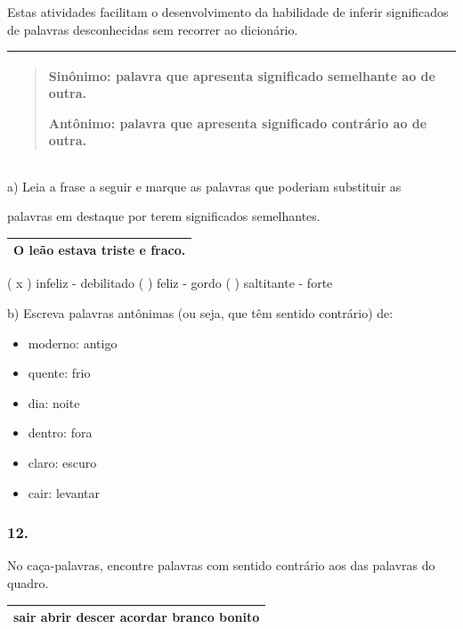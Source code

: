 Estas atividades facilitam o desenvolvimento da habilidade de inferir
significados de palavras desconhecidas sem recorrer ao dicionário.

\begin{longtable}[]{@{}l@{}}
\toprule
\begin{minipage}[t]{0.97\columnwidth}\raggedright\strut
\begin{quote}
\textbf{Sinônimo:} palavra que apresenta significado semelhante ao de
outra.

\textbf{Antônimo:} palavra que apresenta significado contrário ao de
outra.
\end{quote}\strut
\end{minipage}\tabularnewline
\bottomrule
\end{longtable}

a) Leia a frase a seguir e marque as palavras que poderiam substituir as

palavras em destaque por terem significados semelhantes.

\begin{longtable}[]{@{}l@{}}
\toprule
O leão estava \textbf{triste} e \textbf{fraco}.\tabularnewline
\bottomrule
\end{longtable}

( x ) infeliz - debilitado ( ) feliz - gordo ( ) saltitante - forte

b) Escreva palavras antônimas (ou seja, que têm sentido contrário) de:

\begin{itemize}
\item
  moderno: antigo
\item
  quente: frio
\item
  dia: noite
\item
  dentro: fora
\item
  claro: escuro
\item
  cair: levantar
\end{itemize}

\subsubsection{12. }\label{section-11}

No caça-palavras, encontre palavras com sentido contrário aos das
palavras do quadro.

\begin{longtable}[]{@{}l@{}}
\toprule
\textbf{sair abrir descer acordar branco bonito}\tabularnewline
\bottomrule
\end{longtable}

